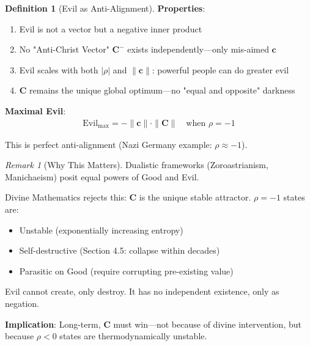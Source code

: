 \documentclass[11pt,a4paper]{article}
\theoremstyle{definition}
\newtheorem{definition}{Definition}[section]
\theoremstyle{remark}
\newtheorem{remark}{Remark}[section]
\newcommand{\cc}{\mathbf{c}}
\begin{document}
\begin{enumerate}
\begin{definition}[Evil as Anti-Alignment]
\textbf{Properties}:
\begin{enumerate}
    \item Evil is not a vector but a negative inner product
    \item No "Anti-Christ Vector" \(\mathbf{C}^-\) exists independently—only mis-aimed \(\cc\)
    \item Evil scales with both \(|\rho|\) and \(\|\cc\|\): powerful people can do greater evil
    \item \(\mathbf{C}\) remains the unique global optimum—no "equal and opposite" darkness
\end{enumerate}

\textbf{Maximal Evil}:
\begin{align}
\text{Evil}_{\max} = -\|\cc\| \cdot \|\mathbf{C}\| \quad \text{when } \rho = -1
\end{align}

This is perfect anti-alignment (Nazi Germany example: \(\rho \approx -1\)).
\end{definition}

\begin{remark}[Why This Matters]
Dualistic frameworks (Zoroastrianism, Manichaeism) posit equal powers of Good and Evil.

Divine Mathematics rejects this: \(\mathbf{C}\) is the unique stable attractor. \(\rho = -1\) states are:
\begin{itemize}
    \item Unstable (exponentially increasing entropy)
    \item Self-destructive (Section 4.5: collapse within decades)
    \item Parasitic on Good (require corrupting pre-existing value)
\end{itemize}

Evil cannot create, only destroy. It has no independent existence, only as negation.

\textbf{Implication}: Long-term, \(\mathbf{C}\) must win—not because of divine intervention, but because \(\rho < 0\) states are thermodynamically unstable.
\end{remark}

\begin{figure}[H]
\centering
{}
\end{figure}
\end{enumerate}
\end{document}
